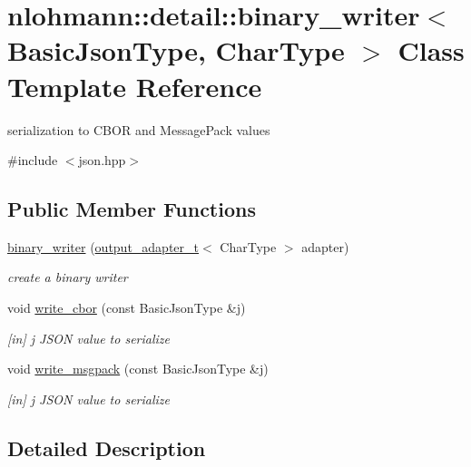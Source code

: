 \hypertarget{classnlohmann_1_1detail_1_1binary__writer}{}\section{nlohmann\+:\+:detail\+:\+:binary\+\_\+writer$<$ Basic\+Json\+Type, Char\+Type $>$ Class Template Reference}
\label{classnlohmann_1_1detail_1_1binary__writer}


serialization to C\+B\+OR and Message\+Pack values  




{\ttfamily \#include $<$json.\+hpp$>$}

\subsection*{Public Member Functions}
\begin{DoxyCompactItemize}
\item 
\hyperlink{classnlohmann_1_1detail_1_1binary__writer_a373289af95a946c19bb4a58a5df71a78}{binary\+\_\+writer} (\hyperlink{namespacenlohmann_1_1detail_a0fd8edff7729aa2dd92b070964bade2e}{output\+\_\+adapter\+\_\+t}$<$ Char\+Type $>$ adapter)
\begin{DoxyCompactList}\small\item\em create a binary writer \end{DoxyCompactList}\item 
void \hyperlink{classnlohmann_1_1detail_1_1binary__writer_aa0ab8d27fd88a33a2f801413ac4c7fbc}{write\+\_\+cbor} (const Basic\+Json\+Type \&j)
\begin{DoxyCompactList}\small\item\em \mbox{[}in\mbox{]} j J\+S\+ON value to serialize \end{DoxyCompactList}\item 
void \hyperlink{classnlohmann_1_1detail_1_1binary__writer_ae4e0852b64102ce4b07d99f08f828b7c}{write\+\_\+msgpack} (const Basic\+Json\+Type \&j)
\begin{DoxyCompactList}\small\item\em \mbox{[}in\mbox{]} j J\+S\+ON value to serialize \end{DoxyCompactList}\end{DoxyCompactItemize}


\subsection{Detailed Description}
